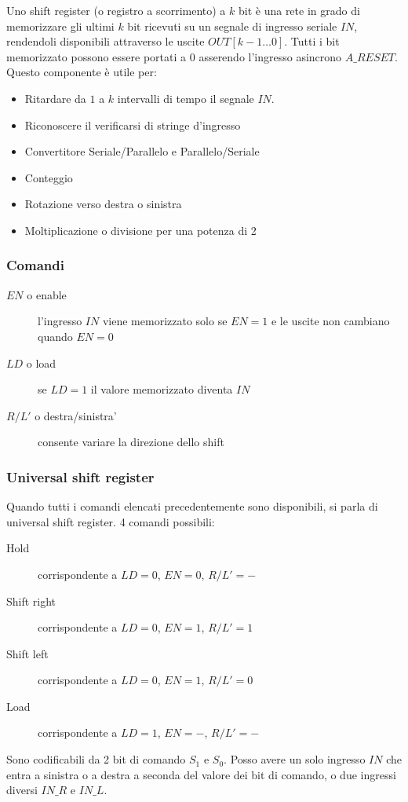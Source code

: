 \documentclass{subfiles}
\begin{document}
Uno shift register (o registro a scorrimento) a $k$ bit è una rete in grado di memorizzare gli ultimi $k$ bit ricevuti su un segnale di ingresso seriale $IN$, rendendoli disponibili attraverso le uscite $OUT[k-1 \dots 0]$.
Tutti i bit memorizzato possono essere portati a $0$ asserendo l'ingresso asincrono $A\_RESET$.
Questo componente è utile per:

\begin{itemize}
    \item Ritardare da $1$ a $k$ intervalli di tempo il segnale $IN$.
    \item Riconoscere il verificarsi di stringe d'ingresso
    \item Convertitore Seriale/Parallelo e Parallelo/Seriale
    \item Conteggio
    \item Rotazione verso destra o sinistra
    \item Moltiplicazione o divisione per una potenza di 2
\end{itemize}

\subsubsection{Comandi}

\begin{description}
    \item[$EN$ o enable] l'ingresso $IN$ viene memorizzato solo se $EN=1$ e le uscite non cambiano quando $EN=0$
    \item[$LD$ o load] se $LD=1$ il valore memorizzato diventa $IN$
    \item[$R/L'$ o destra/sinistra'] consente variare la direzione dello shift
\end{description}

\subsubsection{Universal shift register}

Quando tutti i comandi elencati precedentemente sono disponibili, si parla di universal shift register.
4 comandi possibili:

\begin{description}
    \item[Hold] corrispondente a $LD=0$, $EN=0$, $R/L'=-$
    \item[Shift right] corrispondente a $LD=0$, $EN=1$, $R/L'=1$
    \item[Shift left] corrispondente a $LD=0$, $EN=1$, $R/L'=0$
    \item[Load] corrispondente a $LD=1$, $EN=-$, $R/L'=-$
\end{description}

\noindent
Sono codificabili da 2 bit di comando $S_1$ e $S_0$.
Posso avere un solo ingresso $IN$ che entra a sinistra o a destra a seconda del valore dei bit di comando, o due ingressi diversi $IN\_R$ e $IN\_L$.
\end{document}
